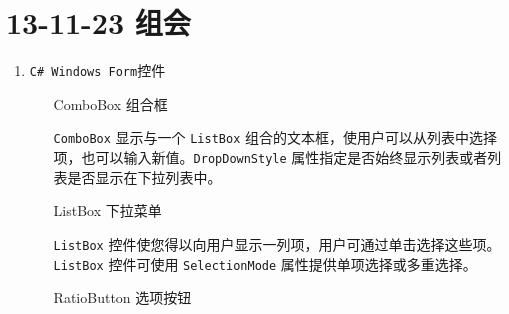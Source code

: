 \documentclass[]{report}
\begin{document}
\section{13-11-23 组会}
\begin{enumerate}
	\item \verb|C# Windows Form|控件
	\begin{itemize}
		\item[ComboBox] 组合框
		
			\verb|ComboBox| 显示与一个 \verb|ListBox| 组合的文本框，使用户可以从列表中选择项，也可以输入新值。\verb|DropDownStyle| 属性指定是否始终显示列表或者列表是否显示在下拉列表中。
		\item[ListBox] 下拉菜单
		
			\verb|ListBox| 控件使您得以向用户显示一列项，用户可通过单击选择这些项。 \verb|ListBox| 控件可使用 \verb|SelectionMode| 属性提供单项选择或多重选择。
		\item[RatioButton] 选项按钮
		

\end{itemize}
\end{enumerate}
\end{document}
